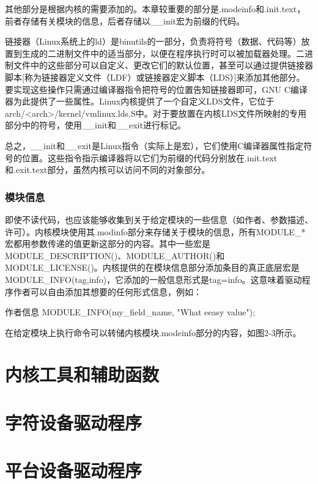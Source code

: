 \documentclass[lang=cn,newtx,10pt,scheme=chinese]{elegantbook}
\begin{document}
其他部分是根据内核的需要添加的。本章较重要的部分是.modeinfo和.init.text，前者存储有关模块的信息，后者存储以\_\_init宏为前缀的代码。

链接器（Linux系统上的ld）是binutils的一部分，负责将符号（数据、代码等）放置到生成的二进制文件中的适当部分，以便在程序执行时可以被加载器处理。二进制文件中的这些部分可以自定义、更改它们的默认位置，甚至可以通过提供链接器脚本[称为链接器定义文件（LDF）或链接器定义脚本（LDS）]来添加其他部分。要实现这些操作只需通过编译器指令把符号的位置告知链接器即可，GNU C编译器为此提供了一些属性。Linux内核提供了一个自定义LDS文件，它位于arch/<arch>/kernel/vmlinux.lds.S中。对于要放置在内核LDS文件所映射的专用部分中的符号，使用\_\_init和\_\_exit进行标记。

总之，\_\_init和\_\_exit是Linux指令（实际上是宏），它们使用C编译器属性指定符号的位置。这些指令指示编译器将以它们为前缀的代码分别放在.init.text和.exit.text部分，虽然内核可以访问不同的对象部分。

\subsection{模块信息}

即使不读代码，也应该能够收集到关于给定模块的一些信息（如作者、参数描述、许可）。内核模块使用其.modinfo部分来存储关于模块的信息，所有MODULE\_*宏都用参数传递的值更新这部分的内容。其中一些宏是MODULE\_DESCRIPTION()、MODULE\_AUTHOR()和MODULE\_LICENSE()。内核提供的在模块信息部分添加条目的真正底层宏是MODULE\_INFO(tag,info)，它添加的一般信息形式是tag=info。这意味着驱动程序作者可以自由添加其想要的任何形式信息，例如：

\begin{mycode}{作者信息}
MODULE_INFO(my_field_name, "What eeasy value");
\end{mycode}

在给定模块上执行命令可以转储内核模块.modeinfo部分的内容，如图2-3所示。

\chapter{内核工具和辅助函数}

\chapter{字符设备驱动程序}

\chapter{平台设备驱动程序}
\end{document}
